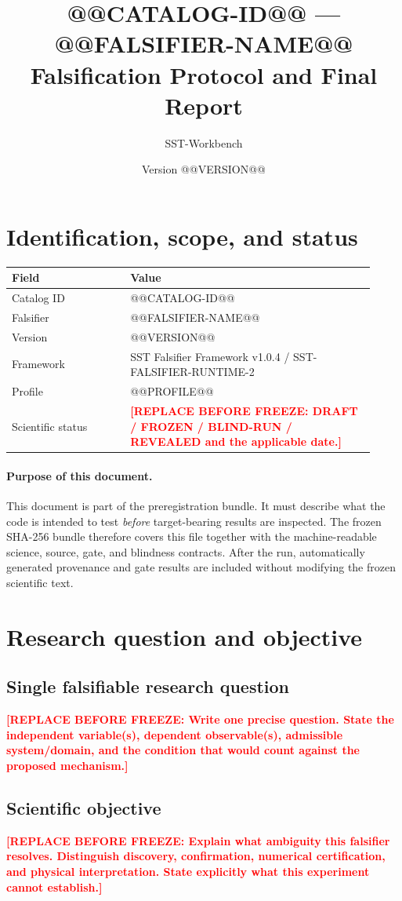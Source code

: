 \documentclass[11pt,a4paper]{article}
\title{@@CATALOG-ID@@ --- @@FALSIFIER-NAME@@\\Falsification Protocol and Final Report}
\author{SST-Workbench}
\date{Version @@VERSION@@}
\newcommand{\SSTTODO}[1]{\ifmmode\text{\color{red}\bfseries TODO}\else\textcolor{red}{\textbf{[REPLACE BEFORE FREEZE: #1]}}\fi}
\begin{document}
\maketitle

\section{Identification, scope, and status}
\begin{longtable}{p{0.30\linewidth}p{0.62\linewidth}}
\toprule
Field & Value \\
\midrule
Catalog ID & @@CATALOG-ID@@ \\
Falsifier & @@FALSIFIER-NAME@@ \\
Version & @@VERSION@@ \\
Framework & SST Falsifier Framework v1.0.4 / SST-FALSIFIER-RUNTIME-2 \\
Profile & @@PROFILE@@ \\
Scientific status & \SSTTODO{DRAFT / FROZEN / BLIND-RUN / REVEALED and the applicable date.} \\
\bottomrule
\end{longtable}

\paragraph{Purpose of this document.}
This document is part of the preregistration bundle. It must describe what the code is intended to test \emph{before} target-bearing results are inspected. The frozen SHA-256 bundle therefore covers this file together with the machine-readable science, source, gate, and blindness contracts. After the run, automatically generated provenance and gate results are included without modifying the frozen scientific text.

\section{Research question and objective}
\subsection{Single falsifiable research question}
\SSTTODO{Write one precise question. State the independent variable(s), dependent observable(s), admissible system/domain, and the condition that would count against the proposed mechanism.}

\subsection{Scientific objective}
\SSTTODO{Explain what ambiguity this falsifier resolves. Distinguish discovery, confirmation, numerical certification, and physical interpretation. State explicitly what this experiment cannot establish.}
\end{document}
